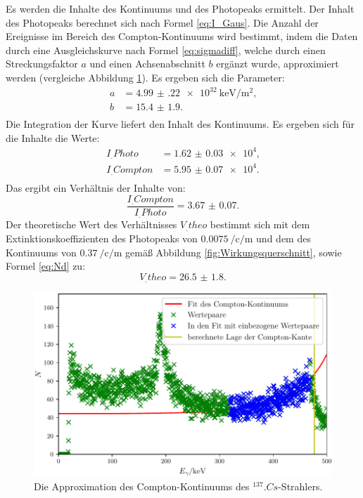 \newpage
\noindent Es werden die Inhalte des Kontinuums und des Photopeaks ermittelt. Der Inhalt des Photopeaks berechnet sich nach Formel \eqref{eq:I_Gaus}. Die Anzahl der Ereignisse im Bereich des Compton-Kontinuums wird bestimmt, indem die Daten durch eine Ausgleichskurve nach Formel \eqref{eq:sigmadiff}, welche durch einen Streckungsfaktor $a$ und einen Achsenabschnitt $b$ ergänzt wurde, approximiert werden (vergleiche Abbildung \ref{fig:Comptonkontinuum}). Es ergeben sich die Parameter:
\begin{align*}
a	&= \SI{4.99(22)e32}{\kilo\electronvolt\per\metre\squared}\text{,}\\
b	&= \num{15.4(19)}\text{.}\\
\end{align*}
Die Integration der Kurve liefert den Inhalt des Kontinuums.
Es ergeben sich für die Inhalte die Werte:
\begin{align*}
I_.{Photo} 	 &= \num{1.62(3)e4}\text{,}\\
I_.{Compton} &= \num{5.95(7)e4}\text{.}\\
\end{align*} 
Das ergibt ein Verhältnis der Inhalte von:
\[
\frac{I_.{Compton}}{I_.{Photo}} = \num{3.67(7)}\text{.}
\]
Der theoretische Wert des Verhältnisses $V_.{theo}$ bestimmt sich mit dem Extinktionskoeffizienten des Photopeaks von $\SI{0.0075}{\per\centi\per\metre}$ und dem des Kontinuums von $\SI{0.37}{\per\centi\per\metre}$ gemäß Abbildung \ref{fig:Wirkungsquerschnitt}, sowie Formel \eqref{eq:Nd} zu: 
\[
V_.{theo} = \num{26.5(18)}\text{.}
\]

\begin{figure}
	\centering
	\includegraphics[width=\linewidth-70pt,height=\textheight-70pt,keepaspectratio]{content/images/Cs137Kon.pdf}
	\caption{Die Approximation des Compton-Kontinuums des $^{137}.{Cs}$-Strahlers.}
	\label{fig:Comptonkontinuum}
\end{figure}


